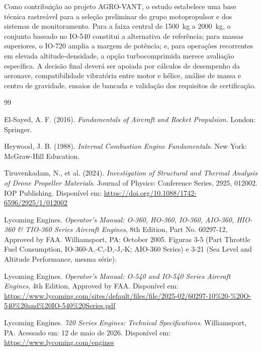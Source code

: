 \documentclass[a4paper,12pt]{article}
\begin{document}
Como contribuição ao projeto AGRO-VANT, o estudo estabelece uma base técnica rastreável para a seleção preliminar do grupo motopropulsor e dos sistemas de monitoramento. Para a faixa central de \SI{1500}{kg} a \SI{2000}{kg}, o conjunto baseado no IO-540 constitui a alternativa de referência; para massas superiores, o IO-720 amplia a margem de potência; e, para operações recorrentes em elevada altitude-densidade, a opção turbocomprimida merece avaliação específica. A decisão final deverá ser apoiada por cálculos de desempenho da aeronave, compatibilidade vibratória entre motor e hélice, análise de massa e centro de gravidade, ensaios de bancada e validação dos requisitos de certificação.

\newpage

\begin{thebibliography}{99}

    El-Sayed, A. F. (2016). \textit{Fundamentals of Aircraft and Rocket Propulsion}. London: Springer.

    Heywood, J. B. (1988). \textit{Internal Combustion Engine Fundamentals}. New York: McGraw-Hill Education.

    Tiruvenkadam, N., et al. (2024). \textit{Investigation of Structural and Thermal Analysis of Drone Propeller Materials}. Journal of Physics: Conference Series, 2925, 012002. IOP Publishing. Disponível em: \url{https://doi.org/10.1088/1742-6596/2925/1/012002}


    Lycoming Engines. \textit{Operator's Manual: O-360, HO-360, IO-360, AIO-360, HIO-360 \& TIO-360 Series Aircraft Engines}, 8th Edition, Part No. 60297-12, Approved by FAA. Williamsport, PA: October 2005. Figuras 3-5 (Part Throttle Fuel Consumption, IO-360-A,-C,-D,-J,-K; AIO-360 Series) e 3-21 (Sea Level and Altitude Performance, mesma série).

    Lycoming Engines. \textit{Operator's Manual: O-540 and IO-540 Series Aircraft Engines}, 4th Edition, Approved by FAA. Disponível em: \url{https://www.lycoming.com/sites/default/files/file/2025-02/60297-10\%20-\%20O-540\%20and\%20IO-540\%20Series.pdf}

    Lycoming Engines. \textit{720 Series Engines: Technical Specifications}. Williamsport, PA. Acessado em: 12 de maio de 2026. Disponível em: \url{https://www.lycoming.com/engines}


\end{thebibliography}
\end{document}
